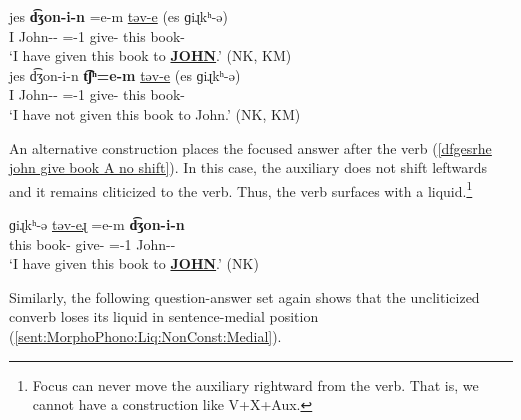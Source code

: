 \begin{exe}
	\ex\begin{xlist}
		\ex \gll  jes \textbf{d͡ʒon-i-n} \colorbox{lsLightGray}{{=e-m}} \uline{təv-e}  (es ɡiɻkʰ-ə) 
		\\
		I John-{\dat}-{}  ={\auxgloss}-1{\sg}  give-{\perfcvb}  this book-{}
		\\
		\trans `I have given this book to  \textbf{\uline{JOHN}}.' \hfill (NK, KM) \label{dfgesrhe john give book A v medial }
		\\
		\ex \gll  jes {d͡ʒon-i-n} \textbf{t͡ʃʰ\colorbox{lsLightGray}{{=e-m}}} \uline{təv-e}  (es ɡiɻkʰ-ə) 
		\\
		I John-{\dat}-{}  {\neggloss}={\auxgloss}-1{\sg}  give-{\perfcvb}  this book-{}
		\\
		\trans `I have not given this book to John.' \hfill (NK, KM) \label{dfgesrhe john give book A v medial neg }
		\\
		
	\end{xlist}
\end{exe}

An alternative construction     places the focused answer after the verb (\ref{dfgesrhe john give book A no shift}). In this case, the auxiliary does not shift leftwards and it remains cliticized to the verb. Thus, the verb surfaces with a liquid.\footnote{Focus can never move the auxiliary rightward from the verb. That is, we cannot have a construction like V+X+Aux.}

\begin{exe}
	\ex {} ɡiɻkʰ-ə \uline{təv-eɻ} \colorbox{lsLightGray}{{=e-m}}  \textbf{d͡ʒon-i-n}
	\\
	this  book-{} give-{\perfcvb}    ={\auxgloss}-1{\sg}   John-{\dat}-{}
	\\
	\trans `I have given this book to \textbf{\uline{JOHN}}.' \hfill (NK) \label{dfgesrhe john give book A no shift}
	\\
\end{exe}

Similarly, the following question-answer set again shows that the uncliticized converb loses its liquid in   sentence-medial position (\ref{sent:MorphoPhono:Liq:NonConst:Medial}). 

